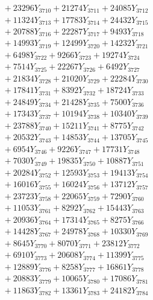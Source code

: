 \documentclass[a4paper,10pt]{article}
\begin{document}
{\begin{align}
&\;  + 23296 Y_{3710} + 21274 Y_{3711} + 24085 Y_{3712} \\[0.3ex]
&\;  + 11324 Y_{3713} + 17783 Y_{3714} + 24432 Y_{3715} \\[0.3ex]
&\;  + 20788 Y_{3716} + 22287 Y_{3717} + 9493 Y_{3718} \\[0.5ex]\allowbreak
&\;  + 14993 Y_{3719} + 12499 Y_{3720} + 14232 Y_{3721} \\[0.3ex]
&\;  + 6498 Y_{3722} + 9266 Y_{3723} + 19274 Y_{3724} \\[0.3ex]
&\;  + 7514 Y_{3725} + 22267 Y_{3726} + 6492 Y_{3727} \\[0.3ex]
&\;  + 21834 Y_{3728} + 21020 Y_{3729} + 22284 Y_{3730} \\[0.3ex]
&\;  + 17841 Y_{3731} + 8392 Y_{3732} + 18724 Y_{3733} \\[0.3ex]
&\;  + 24849 Y_{3734} + 21428 Y_{3735} + 7500 Y_{3736} \\[0.3ex]
&\;  + 17343 Y_{3737} + 10194 Y_{3738} + 10340 Y_{3739} \\[0.3ex]
&\;  + 23788 Y_{3740} + 15211 Y_{3741} + 8775 Y_{3742} \\[0.3ex]
&\;  + 20532 Y_{3743} + 14853 Y_{3744} + 13705 Y_{3745} \\[0.3ex]
&\;  + 6954 Y_{3746} + 9226 Y_{3747} + 17731 Y_{3748} \\[0.5ex]\allowbreak
&\;  + 7030 Y_{3749} + 19835 Y_{3750} + 10887 Y_{3751} \\[0.3ex]
&\;  + 20284 Y_{3752} + 12593 Y_{3753} + 19413 Y_{3754} \\[0.3ex]
&\;  + 16016 Y_{3755} + 16024 Y_{3756} + 13712 Y_{3757} \\[0.3ex]
&\;  + 23723 Y_{3758} + 22065 Y_{3759} + 7290 Y_{3760} \\[0.3ex]
&\;  + 11053 Y_{3761} + 8292 Y_{3762} + 15443 Y_{3763} \\[0.3ex]
&\;  + 20936 Y_{3764} + 17314 Y_{3765} + 8275 Y_{3766} \\[0.3ex]
&\;  + 14428 Y_{3767} + 24978 Y_{3768} + 10330 Y_{3769} \\[0.3ex]
&\;  + 8645 Y_{3770} + 8070 Y_{3771} + 23812 Y_{3772} \\[0.3ex]
&\;  + 6910 Y_{3773} + 20608 Y_{3774} + 11399 Y_{3775} \\[0.3ex]
&\;  + 12889 Y_{3776} + 8258 Y_{3777} + 16861 Y_{3778} \\[0.5ex]\allowbreak
&\;  + 20883 Y_{3779} + 10065 Y_{3780} + 17086 Y_{3781} \\[0.3ex]
&\;  + 11863 Y_{3782} + 13361 Y_{3783} + 24182 Y_{3784} \\[0.3ex]

\end{align}}
\end{document}
